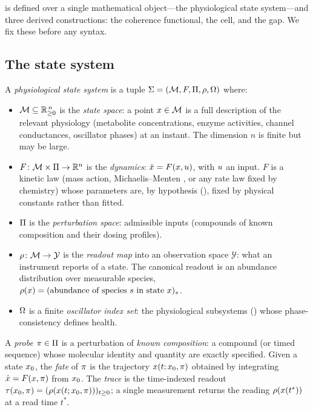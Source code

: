  is defined over a single mathematical object---the physiological
state system---and three derived constructions: the coherence functional, the
cell, and the gap. We fix these before any syntax.

\subsection{The state system}

\begin{definition}
\label{cfc:def:system}
A \emph{physiological state system} is a tuple
$\Sigma=(\mathcal{M},F,\Pi,\rho,\Omega)$ where:
\begin{itemize}[leftmargin=1.4em,itemsep=2pt]
\item $\mathcal{M}\subseteq\mathbb{R}_{\ge 0}^{\,n}$ is the \emph{state space}: a point $x\in\mathcal{M}$
is a full description of the relevant physiology (metabolite concentrations,
enzyme activities, channel conductances, oscillator phases) at an instant. The
dimension $n$ is finite but may be large.
\item $F\colon\mathcal{M}\times\Pi\to\mathbb{R}^{n}$ is the \emph{dynamics}:
$\dot{x}=F(x,u)$, with $u$ an input. $F$ is a kinetic law (mass
action, Michaelis--Menten \citep{michaelis1913}, or any rate law fixed by
chemistry) whose parameters are, by hypothesis (), fixed by
physical constants rather than fitted.
\item $\Pi$ is the \emph{perturbation space}: admissible inputs (compounds
of known composition and their dosing profiles).
\item $\rho\colon\mathcal{M}\to\mathcal{Y}$ is the \emph{readout map} into an
observation space $\mathcal{Y}$: what an instrument reports of a state. The
canonical readout is an abundance distribution over measurable species,
$\rho(x)=(\text{abundance of species }s\text{ in state }x)_{s}$.
\item $\Omega$ is a finite \emph{oscillator index set}: the physiological
subsystems () whose phase-consistency defines health.
\end{itemize}
\end{definition}

\begin{definition}
\label{cfc:def:probe}
A \emph{probe} $\pi\in\Pi$ is a perturbation of \emph{known
composition}: a compound (or timed sequence) whose molecular identity and
quantity are exactly specified. Given a state $x_0$, the \emph{fate} of
$\pi$ is the trajectory $x(t;x_0,\pi)$ obtained by integrating
$\dot{x}=F(x,\pi)$ from $x_0$. The \emph{trace} is the time-indexed
readout $\tau(x_0,\pi)=(\rho(x(t;x_0,\pi)))_{t\ge0}$; a single
measurement returns the reading $\rho(x(t^{\ast}))$ at a read time
$t^{\ast}$.
\end{definition}

